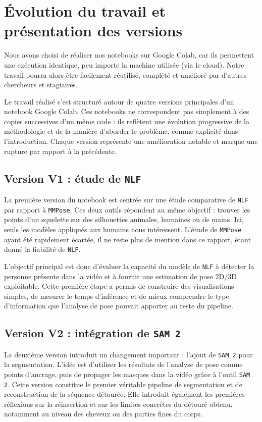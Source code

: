 \documentclass[11pt,a4paper]{article}
\begin{document}
\newpage

\section{Évolution du travail et présentation des versions}
Nous avons choisi de réaliser nos notebooks sur Google Colab, car ils permettent une exécution identique, peu importe la machine utilisée (via le cloud).
Notre travail pourra alors être facilement réutilisé, complété et amélioré par d'autres chercheurs et stagiaires. 

Le travail réalisé s'est structuré autour de quatre versions principales d'un notebook Google Colab.
Ces notebooks ne correspondent pas simplement à des copies successives d'un même code : ils reflètent une évolution progressive de la méthodologie et de la manière d'aborder le problème, comme explicité dans l'introduction.
Chaque version représente une amélioration notable et marque une rupture par rapport à la précédente.

\subsection{Version V1 : étude de \texttt{NLF}}
La première version du notebook est centrée sur une étude comparative de \texttt{NLF} par rapport à \texttt{MMPose}.
Ces deux outils répondent au même objectif : trouver les points d'un squelette sur des silhouettes animales, humaines ou de mains. Ici, seuls les modèles appliqués aux humains nous intéressent.
L'étude de \texttt{MMPose} ayant été rapidement écartée, il ne reste plus de mention dans ce rapport, étant donné la fiabilité de \texttt{NLF}.

L'objectif principal est donc d'évaluer la capacité du modèle de \texttt{NLF} à détecter la personne présente dans la vidéo et à fournir une estimation de pose 2D/3D exploitable.
Cette première étape a permis de construire des visualisations simples, de mesurer le temps d'inférence et de mieux comprendre le type d'information que l'analyse de pose pouvait apporter au reste du pipeline.

\subsection{Version V2 : intégration de \texttt{SAM 2}}
La deuxième version introduit un changement important : l'ajout de \texttt{SAM 2} pour la segmentation.
L'idée est d'utiliser les résultats de l'analyse de pose comme points d'ancrage, puis de propager les masques dans la vidéo grâce à l'outil \texttt{SAM 2}.
Cette version constitue le premier véritable pipeline de segmentation et de reconstruction de la séquence détourée.
Elle introduit également les premières réflexions sur la réinsertion et sur les limites concrètes du détouré obtenu, notamment au niveau des cheveux ou des parties fines du corps.
\end{document}
